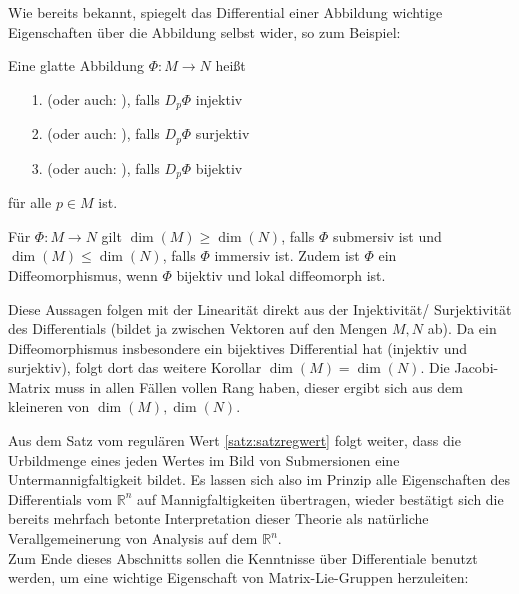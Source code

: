 \documentclass[../H_Analysis_main.tex]{subfiles}
\begin{document}
Wie bereits bekannt, spiegelt das Differential einer Abbildung wichtige Eigenschaften über die Abbildung selbst wider, so zum Beispiel:
\begin{defi}
Eine glatte Abbildung $\Phi: M \rightarrow N$ heißt 
\begin{itemize}
\item[1.]  (oder auch: ), falls $D_p \Phi$ injektiv

\item[2.]  (oder auch: ), falls $D_p \Phi$ surjektiv

\item[3.]  (oder auch: ), falls $D_p \Phi$ bijektiv
\end{itemize}
für alle $p \in M$ ist.
\end{defi}

\begin{cor}
Für $\Phi: M \rightarrow N$ gilt $\dim(M) \geq \dim(N)$, falls $\Phi$ submersiv ist und $\dim(M) \leq \dim(N)$, falls $\Phi$ immersiv ist. Zudem ist $\Phi$ ein Diffeomorphismus, wenn $\Phi$ bijektiv und lokal diffeomorph ist.
\end{cor}
Diese Aussagen folgen mit der Linearität direkt aus der Injektivität/ Surjektivität des Differentials (bildet ja zwischen Vektoren auf den Mengen $M, N$ ab). Da ein Diffeomorphismus insbesondere ein bijektives Differential hat (injektiv und surjektiv), folgt dort das weitere Korollar $\dim(M) = \dim(N)$. Die Jacobi-Matrix muss in allen Fällen vollen Rang haben, dieser ergibt sich aus dem kleineren von $\dim(M), \dim(N)$.


Aus dem Satz vom regulären Wert \ref{satz:satzregwert} folgt weiter, dass die Urbildmenge eines jeden Wertes im Bild von Submersionen eine Untermannigfaltigkeit bildet. Es lassen sich also im Prinzip alle Eigenschaften des Differentials vom $\mathbb{R}^n$ auf Mannigfaltigkeiten übertragen, wieder bestätigt sich die bereits mehrfach betonte Interpretation dieser Theorie als natürliche Verallgemeinerung von Analysis auf dem $\mathbb{R}^n$.\\


Zum Ende dieses Abschnitts sollen die Kenntnisse über Differentiale benutzt werden, um eine wichtige Eigenschaft von Matrix-Lie-Gruppen herzuleiten:
\end{document}
